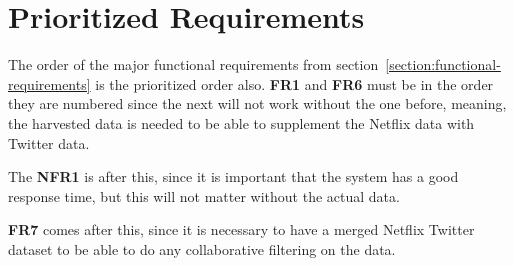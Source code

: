 \section{Prioritized Requirements}
The order of the major functional requirements from section~\ref{section:functional-requirements} is the prioritized order also. \textbf{FR1} and \textbf{FR6} must be in the order they are numbered since the next will not work without the one before, meaning, the harvested data is needed to be able to supplement the Netflix data with Twitter data.

The \textbf{NFR1} is after this, since it is important that the system has a good response time, but this will not matter without the actual data.

\textbf{FR7} comes after this, since it is necessary to have a merged Netflix Twitter dataset to be able to do any collaborative filtering on the data.
